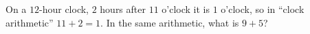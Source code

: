 On a $12$-hour clock, $2$ hours after $11$ o'clock it is $1$ o'clock, so in ``clock arithmetic'' $11+2=1$. In the same arithmetic, what is $9+5$?
